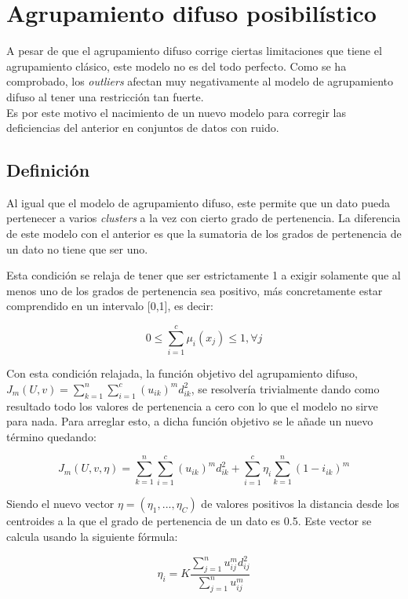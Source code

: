 \documentclass[]{report}
\begin{document}
	\chapter{Agrupamiento difuso posibilístico}
	
		A pesar de que el agrupamiento difuso corrige ciertas limitaciones que tiene el agrupamiento clásico, este modelo no es del todo perfecto. Como se ha comprobado, los \textit{outliers} afectan muy negativamente al modelo de agrupamiento difuso al tener una restricción tan fuerte.\\
		
		Es por este motivo el nacimiento de un nuevo modelo para corregir las deficiencias del anterior en conjuntos de datos con ruido.
	
		\section{Definición}
		
		Al igual que el modelo de agrupamiento difuso, este permite que un dato pueda pertenecer a varios \textit{clusters} a la vez con cierto grado de pertenencia. La diferencia de este modelo con el anterior es que la sumatoria de los grados de pertenencia de un dato no tiene que ser uno.
		
		Esta condición se relaja de tener que ser estrictamente 1 a exigir solamente que al menos uno de los grados de pertenencia sea positivo, más concretamente estar comprendido en un intervalo [0,1], es decir:
		
		$$ 0 \leq \sum_{i=1}^c\mu_i(x_j) \leq 1, \forall j $$
		
		Con esta condición relajada, la función objetivo del agrupamiento difuso, $J_m(U,v) = \sum_{k=1}^n \sum_{i=1}^c (u_{ik})^m d^2_{ik}$, se resolvería trivialmente dando como resultado todo los valores de pertenencia a cero con lo que el modelo no sirve para nada. Para arreglar esto, a dicha función objetivo se le añade un nuevo término quedando:
		
		$$J_m(U,v,\eta) = \sum_{k=1}^n \sum_{i=1}^c (u_{ik})^m d^2_{ik} + \sum_{i=1}^c \eta _i \sum_{k=1}^n (1-i_{ik})^m$$
		
		Siendo el nuevo vector $\eta = (\eta_1,...,\eta_C)$ de valores positivos la distancia desde los centroides a la que el grado de pertenencia de un dato es 0.5. Este vector se calcula usando la siguiente fórmula:
		
		$$\eta_i = K \frac{\sum_{j=1}^n u_{ij}^m d_{ij}^2}{\sum_{j=1}^n u_{ij}^m}$$
		
\end{document}
